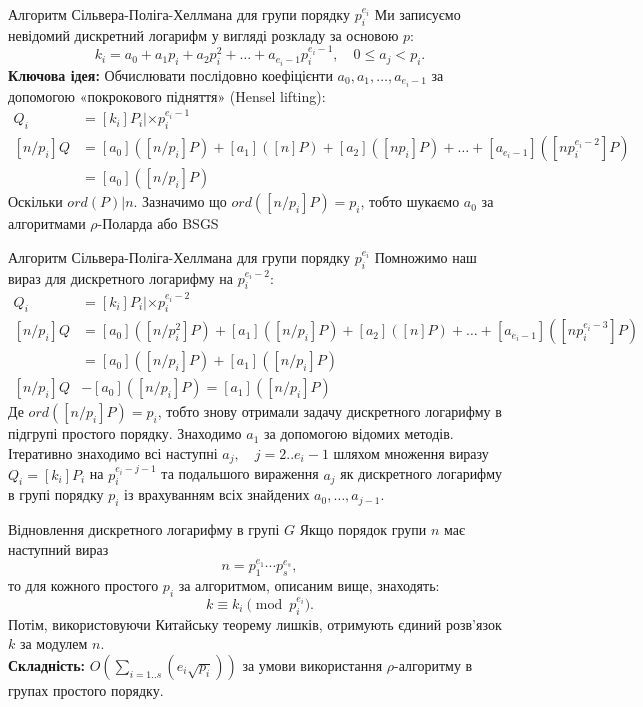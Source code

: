 \documentclass[9pt]{beamer}
\begin{document}
\begin{darkframes}
\begin{frame}{Алгоритм Сільвера-Поліга-Хеллмана для групи порядку \(p_i^{e_i}\)}
  Ми записуємо невідомий дискретний логарифм у вигляді розкладу за основою \(p\):
  \[
  k_i = a_0 + a_1 p_i + a_2 p_i^2 + \dots + a_{e_i-1} p_i^{e_i-1},\quad 0\le a_j < p_i.
  \]
  \textbf{Ключова ідея:} Обчислювати послідовно коефіцієнти \(a_0, a_1, \dots, a_{e_i-1}\) за допомогою «покрокового підняття» (Hensel lifting):
  \begin{align*}
      Q_i &=[k_i]P_i | \times p_i^{e_i-1} \\
      [n/p_i]Q &=[a_0]([n/p_i]P) + [a_1]([n]P) + [a_2]([np_i]P) + \dots + [a_{e_i-1}]([np_i^{e_i-2}]P)\\
      &= [a_0]([n/p_i]P)
  \end{align*}
  Оскільки $ord(P) | n$. Зазначимо що $ord([n/p_i]P)=p_i$, тобто шукаємо $a_0$ за алгоритмами $\rho$-Поларда або BSGS
\end{frame}

\begin{frame}{Алгоритм Сільвера-Поліга-Хеллмана для групи порядку \(p_i^{e_i}\)}
  Помножимо наш вираз для дискретного логарифму на $p_i^{e_i-2}$:
  \begin{align*}
      Q_i &=[k_i]P_i | \times p_i^{e_i-2} \\
      [n/p_i]Q &=[a_0]([n/p_i^2]P) + [a_1]([n/p_i]P) + [a_2]([n]P) + \dots + [a_{e_i-1}]([np_i^{e_i-3}]P)\\
      &= [a_0]([n/p_i]P) + [a_1]([n/p_i]P)\\
      [n/p_i]Q&-[a_0]([n/p_i]P)= [a_1]([n/p_i]P)
  \end{align*}
  Де $ord([n/p_i]P)=p_i$, тобто знову отримали задачу дискретного логарифму в підгрупі простого порядку. Знаходимо $a_1$ за допомогою відомих методів. \\
  Ітеративно знаходимо всі наступні $a_j,\quad j=2..e_i-1$ шляхом множення виразу $Q_i=[k_i]P_i$ на $p_i^{e_i-j-1}$ та подальшого вираження $a_j$ як дискретного логарифму в групі порядку $p_i$ із врахуванням всіх знайдених $a_0,\dots,a_{j-1}$.
\end{frame}

\begin{frame}{Відновлення дискретного логарифму в групі $G$}
  Якщо порядок групи \(n\) має наступний вираз
  \[
  n = p_1^{e_1} \cdots p_s^{e_s},
  \]
  то для кожного простого \(p_i\) за алгоритмом, описаним вище, знаходять:
  \[
  k \equiv k_i \pmod{p_i^{e_i}}.
  \]
  Потім, використовуючи Китайську теорему лишків, отримують єдиний розв'язок \(k\) за модулем \(n\).\\[2mm]
  \textbf{Складність:} $O(\sum_{i=1..s}(e_i\sqrt{p_i}))$ за умови використання $\rho$-алгоритму в групах простого порядку.
\end{frame}


\end{darkframes}
\end{document}
